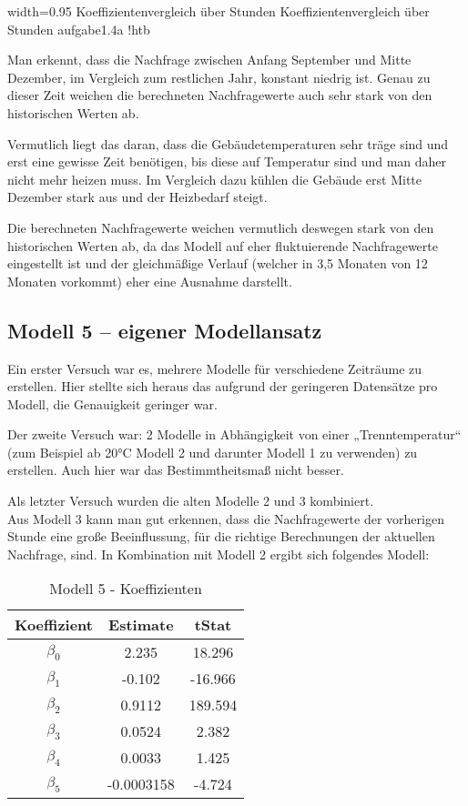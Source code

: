 \documentclass{eegreport}
\begin{document}
{width=0.95\textwidth}
{Koeffizientenvergleich über Stunden}
{Koeffizientenvergleich über Stunden}
{aufgabe1.4a}
{!htb}

Man erkennt, dass die Nachfrage zwischen Anfang September und Mitte Dezember, im Vergleich zum restlichen Jahr, konstant niedrig ist. Genau zu dieser Zeit weichen die berechneten Nachfragewerte auch sehr stark von den historischen Werten ab.

Vermutlich liegt das daran, dass die Gebäudetemperaturen sehr träge sind und erst eine gewisse Zeit benötigen, bis diese auf Temperatur sind und man daher nicht mehr heizen muss. Im Vergleich dazu kühlen die Gebäude erst Mitte Dezember stark aus und der Heizbedarf steigt. 

Die berechneten Nachfragewerte weichen vermutlich deswegen stark von den historischen Werten ab, da das Modell auf eher fluktuierende Nachfragewerte eingestellt ist und der gleichmäßige Verlauf (welcher in 3,5 Monaten von 12 Monaten vorkommt) eher eine Ausnahme darstellt.

\subsection{Modell 5 – eigener Modellansatz}
Ein erster Versuch war es, mehrere Modelle für verschiedene Zeiträume zu erstellen. Hier stellte sich heraus das aufgrund der geringeren Datensätze pro Modell, die Genauigkeit geringer war. 

Der zweite Versuch war: 2 Modelle in Abhängigkeit von einer „Trenntemperatur“ (zum Beispiel ab 20°C Modell 2 und darunter Modell 1 zu verwenden) zu erstellen. Auch hier war das Bestimmtheitsmaß nicht besser.

Als letzter Versuch wurden die alten Modelle 2 und 3 kombiniert. \\
Aus Modell 3 kann man gut erkennen, dass die Nachfragewerte der vorherigen Stunde eine große Beeinflussung, für die richtige Berechnungen der aktuellen Nachfrage, sind.
In Kombination mit Modell 2 ergibt sich folgendes Modell:

\begin{table}[!h]
\begin{center}
\begin{tabular}{|c|c|c|}
\hline 
Koeffizient & Estimate & tStat \\ 
\hline 
$\beta_0$ & 2.235 & 18.296 \\ 
\hline 
$\beta_1$ & -0.102 & -16.966 \\ 
\hline 
$\beta_2$ & 0.9112 & 189.594 \\ 
\hline 
$\beta_3$ & 0.0524 & 2.382 \\ 
\hline 
$\beta_4$ & 0.0033 & 1.425 \\ 
\hline 
$\beta_5$ & -0.0003158 & -4.724 \\ 
\hline 
\end{tabular} 
\end{center}
\caption{Modell 5 - Koeffizienten}
\label{taba}
\end{table}
\end{document}
